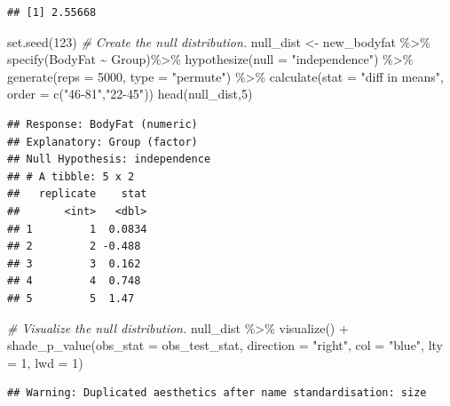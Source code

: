 \documentclass[
]{article}
\newenvironment{Shaded}{\begin{snugshade}}{\end{snugshade}}
\newcommand{\AttributeTok}[1]{\textcolor[rgb]{0.77,0.63,0.00}{#1}}
\newcommand{\CommentTok}[1]{\textcolor[rgb]{0.56,0.35,0.01}{\textit{#1}}}
\newcommand{\DecValTok}[1]{\textcolor[rgb]{0.00,0.00,0.81}{#1}}
\newcommand{\FunctionTok}[1]{\textcolor[rgb]{0.00,0.00,0.00}{#1}}
\newcommand{\NormalTok}[1]{#1}
\newcommand{\OtherTok}[1]{\textcolor[rgb]{0.56,0.35,0.01}{#1}}
\newcommand{\SpecialCharTok}[1]{\textcolor[rgb]{0.00,0.00,0.00}{#1}}
\newcommand{\StringTok}[1]{\textcolor[rgb]{0.31,0.60,0.02}{#1}}
\begin{document}
\begin{verbatim}
## [1] 2.55668
\end{verbatim}

\begin{Shaded}
\begin{Highlighting}[]
\FunctionTok{set.seed}\NormalTok{(}\DecValTok{123}\NormalTok{)}
\CommentTok{\# Create the null distribution.}
\NormalTok{null\_dist }\OtherTok{\textless{}{-}}\NormalTok{ new\_bodyfat }\SpecialCharTok{\%\textgreater{}\%}
  \FunctionTok{specify}\NormalTok{(BodyFat }\SpecialCharTok{\textasciitilde{}}\NormalTok{ Group)}\SpecialCharTok{\%\textgreater{}\%}
  \FunctionTok{hypothesize}\NormalTok{(}\AttributeTok{null =} \StringTok{"independence"}\NormalTok{) }\SpecialCharTok{\%\textgreater{}\%}
  \FunctionTok{generate}\NormalTok{(}\AttributeTok{reps =} \DecValTok{5000}\NormalTok{, }\AttributeTok{type =} \StringTok{"permute"}\NormalTok{) }\SpecialCharTok{\%\textgreater{}\%}
  \FunctionTok{calculate}\NormalTok{(}\AttributeTok{stat =} \StringTok{"diff in means"}\NormalTok{, }\AttributeTok{order =} \FunctionTok{c}\NormalTok{(}\StringTok{"46{-}81"}\NormalTok{,}\StringTok{"22{-}45"}\NormalTok{))}
\FunctionTok{head}\NormalTok{(null\_dist,}\DecValTok{5}\NormalTok{)}
\end{Highlighting}
\end{Shaded}

\begin{verbatim}
## Response: BodyFat (numeric)
## Explanatory: Group (factor)
## Null Hypothesis: independence
## # A tibble: 5 x 2
##   replicate    stat
##       <int>   <dbl>
## 1         1  0.0834
## 2         2 -0.488 
## 3         3  0.162 
## 4         4  0.748 
## 5         5  1.47
\end{verbatim}

\begin{Shaded}
\begin{Highlighting}[]
\CommentTok{\# Visualize the null distribution.}
\NormalTok{null\_dist }\SpecialCharTok{\%\textgreater{}\%}
  \FunctionTok{visualize}\NormalTok{() }\SpecialCharTok{+}
  \FunctionTok{shade\_p\_value}\NormalTok{(}\AttributeTok{obs\_stat =}\NormalTok{ obs\_test\_stat, }\AttributeTok{direction =} \StringTok{"right"}\NormalTok{, }\AttributeTok{col =} \StringTok{"blue"}\NormalTok{, }\AttributeTok{lty =} \DecValTok{1}\NormalTok{, }\AttributeTok{lwd =} \DecValTok{1}\NormalTok{)}
\end{Highlighting}
\end{Shaded}

\begin{verbatim}
## Warning: Duplicated aesthetics after name standardisation: size
\end{verbatim}
\end{document}
